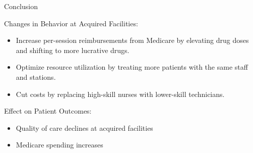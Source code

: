 \begin{frame}{Conclusion}

Changes in Behavior at Acquired Facilities:
    \begin{itemize}
        \item Increase per-session reimbursements from Medicare by elevating drug doses and shifting to more lucrative drugs.
        \item Optimize resource utilization by treating more patients with the same staff and stations.
        \item Cut costs by replacing high-skill nurses with lower-skill technicians.
    \end{itemize}

Effect on Patient Outcomes:
  \begin{itemize}
      \item Quality of care declines at acquired facilities
      \item Medicare spending increases
  \end{itemize}



\end{frame}